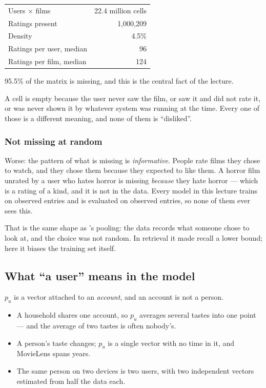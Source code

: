 \documentclass[11pt,a4paper]{article}
\begin{document}
\begin{center}
\small
\begin{tabular}{lr}
\toprule
Users $\times$ films        & 22.4 million cells \\
Ratings present             & 1{,}000{,}209 \\
Density                     & 4.5\% \\
Ratings per user, median    & 96 \\
Ratings per film, median    & 124 \\
\bottomrule
\end{tabular}
\end{center}

95.5\% of the matrix is missing, and this is the central fact of the lecture.

\begin{keybox}[title={Missing is not zero}]
A cell is empty because the user never saw the film, or saw it and did not rate
it, or was never shown it by whatever system was running at the time. Every one
of those is a different meaning, and none of them is ``disliked''.
\end{keybox}

\subsubsection{Not missing at random}

Worse: the pattern of what is missing is \emph{informative}. People rate films
they chose to watch, and they chose them because they expected to like them. A
horror film unrated by a user who hates horror is missing \emph{because} they
hate horror --- which is a rating of a kind, and it is not in the data. Every
model in this lecture trains on observed entries and is evaluated on observed
entries, so none of them ever sees this.

That is the same shape as 's pooling: the data records what someone
chose to look at, and the choice was not random. In retrieval it made recall a
lower bound; here it biases the training set itself.

\subsection{What ``a user'' means in the model}

$p_u$ is a vector attached to an \emph{account}, and an account is not a
person.

\begin{itemize}[leftmargin=*,nosep]
  \item A household shares one account, so $p_u$ averages several tastes into
        one point --- and the average of two tastes is often nobody's.
  \item A person's taste changes; $p_u$ is a single vector with no time in it,
        and MovieLens spans years.
  \item The same person on two devices is two users, with two independent
        vectors estimated from half the data each.
\end{itemize}
\end{document}
